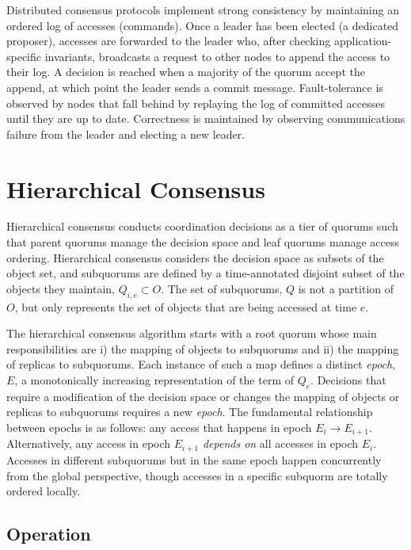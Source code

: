 \documentclass[11pt,letterpaper]{article}
\begin{document}
Distributed consensus protocols implement strong consistency by maintaining an ordered log of accesses (commands). Once a leader has been elected (a dedicated proposer), accesses are forwarded to the leader who, after checking application-specific invariants, broadcasts a request to other nodes to append the access to their log. A decision is reached when a majority of the quorum accept the append, at which point the leader sends a commit message. Fault-tolerance is observed by nodes that fall behind by replaying the log of committed accesses until they are up to date. Correctness is maintained by observing communications failure from the leader and electing a new leader.

\section{Hierarchical Consensus}

Hierarchical consensus conducts coordination decisions as a tier of quorums such that
parent quorums manage the decision space and leaf quorums manage access ordering.
Hierarchical consensus considers the decision space as subsets of the object set, and
subquorums are defined by a time-annotated disjoint subset of the objects they maintain,
$Q_{i,e} \subset O$.
The set of subquorums, $Q$ is not a partition of $O$, but only represents the set of
objects that are being accessed at time $e$.


The hierarchical consensus algorithm starts with a root quorum whose main
responsibilities are i) the mapping of objects to subquorums and ii) the mapping of
replicas to subquorums.
Each instance of such a map defines a distinct \emph{epoch}, $E$, a monotonically
increasing representation of the term of $Q_e$.
Decisions that require a modification of the decision space or changes the mapping of
objects or replicas to subquorums requires a new \emph{epoch}. The fundamental
relationship between epochs is as follows: any access that happens in epoch
$E_i \rightarrow E_{i+1}$. Alternatively, any access in epoch $E_{i+1}$
\emph{depends on} all accesses in epoch $E_i$.
Accesses in different subquorums but in the same epoch happen concurrently from the global
perspective, though accesses in a specific subquorm are totally ordered locally.

\subsection{Operation}
\end{document}
